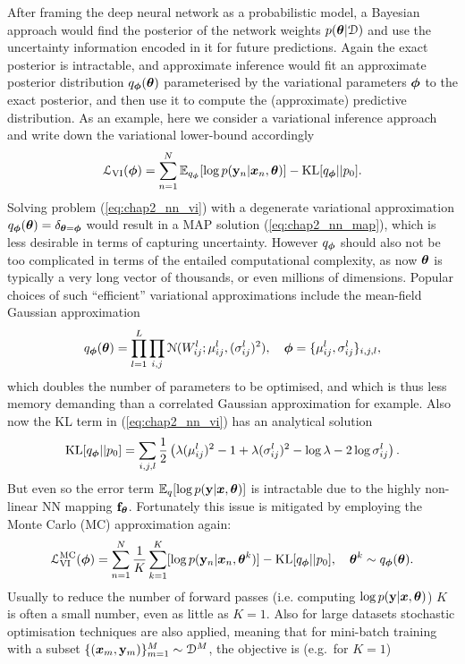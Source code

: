 After framing the deep neural network as a probabilistic model, a Bayesian approach would find the posterior of the network weights $p(\bm{\theta}| \mathcal{D})$ and use the uncertainty information encoded in it for future predictions. Again the exact posterior is intractable, and approximate inference would fit an approximate posterior distribution $q_{\bm{\phi}}(\bm{\theta})$ parameterised by the variational parameters $\bm{\phi}$ to the exact posterior, and then use it to compute the (approximate) predictive distribution.
%
As an example, here we consider a variational inference approach and write down the variational lower-bound accordingly \citep{hinton:mdl1993, barber:ensemble1998}
\begin{equation}
\mathcal{L}_{\text{VI}}(\bm{\phi}) = \sum_{n=1}^N \mathbb{E}_{q_{\bm{\phi}}} [ \log p(\mathbf{y}_n | \bm{x}_n, \bm{\theta}) ] - \text{KL}[q_{\bm{\phi}}||p_0].
\label{eq:chap2_nn_vi}
\end{equation}
Solving problem (\ref{eq:chap2_nn_vi}) with a degenerate variational approximation $q_{\bm{\phi}}(\bm{\theta}) = \delta_{\bm{\theta} = \bm{\phi}}$ would result in a MAP solution (\ref{eq:chap2_nn_map}), which is less desirable in terms of capturing uncertainty. However $q_{\bm{\phi}}$ should also not be too complicated in terms of the entailed computational complexity, as now $\bm{\theta}$ is typically a very long vector of thousands, or even millions of dimensions. Popular choices of such ``efficient'' variational approximations include the mean-field Gaussian approximation
$$q_{\bm{\phi}}(\bm{\theta}) = \prod_{l=1}^L \prod_{i, j} \mathcal{N}(W_{ij}^l; \mu_{ij}^l, (\sigma_{ij}^l)^2 ), \quad \bm{\phi} = \{ \mu_{ij}^l, \sigma_{ij}^l \}_{i, j, l},$$
which doubles the number of parameters to be optimised, and which is thus less memory demanding than a correlated Gaussian approximation for example. Also now the KL term in (\ref{eq:chap2_nn_vi}) has an analytical solution
$$\text{KL}[q_{\bm{\phi}}||p_0] = \sum_{i, j, l} \frac{1}{2} \left( \lambda (\mu_{ij}^l)^2 - 1 + \lambda (\sigma_{ij}^l)^2 - \log \lambda - 2 \log \sigma_{ij}^l \right) .$$ 
But even so the error term $\mathbb{E}_{q}[\log p(\mathbf{y} | \bm{x}, \bm{\theta})]$ is intractable due to the highly non-linear NN mapping $\mathbf{f}_{\bm{\theta}}$. Fortunately this issue is mitigated by employing the Monte Carlo (MC) approximation again:
\begin{equation}
\mathcal{L}_{\text{VI}}^{\text{MC}}(\bm{\phi}) = \sum_{n=1}^N \frac{1}{K} \sum_{k=1}^K [ \log p(\mathbf{y}_n | \bm{x}_n, \bm{\theta}^k) ] - \text{KL}[q_{\bm{\phi}}||p_0], \quad \bm{\theta}^k \sim q_{\bm{\phi}}(\bm{\theta}).
\end{equation}
Usually to reduce the number of forward passes (i.e. computing $\log p(\mathbf{y} | \bm{x}, \bm{\theta})$) $K$ is often a small number, even as little as $K=1$. Also for large datasets stochastic optimisation techniques are also applied, meaning that for mini-batch training with a subset $\{ (\bm{x}_m, \mathbf{y}_m) \}_{m=1}^M \sim \mathcal{D}^M$, the objective is (e.g.~for $K=1$)
